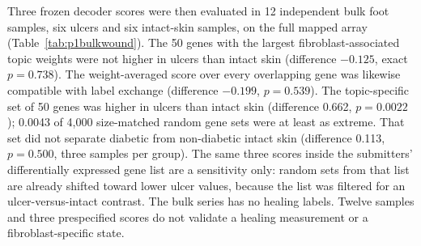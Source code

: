 Three frozen decoder scores were then evaluated in 12 independent bulk foot samples, six ulcers and six intact-skin samples, on the full mapped array (Table~\ref{tab:p1bulkwound}). The 50 genes with the largest fibroblast-associated topic weights were not higher in ulcers than intact skin (difference $-0.125$, exact $p=0.738$). The weight-averaged score over every overlapping gene was likewise compatible with label exchange (difference $-0.199$, $p=0.539$). The topic-specific set of 50 genes was higher in ulcers than intact skin (difference 0.662, $p=0.0022$); 0.0043 of 4,000 size-matched random gene sets were at least as extreme. That set did not separate diabetic from non-diabetic intact skin (difference 0.113, $p=0.500$, three samples per group). The same three scores inside the submitters' differentially expressed gene list are a sensitivity only: random sets from that list are already shifted toward lower ulcer values, because the list was filtered for an ulcer-versus-intact contrast. The bulk series has no healing labels. Twelve samples and three prespecified scores do not validate a healing measurement or a fibroblast-specific state.

